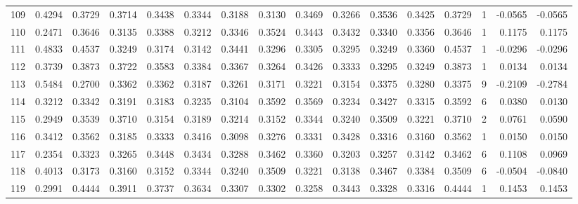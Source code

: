 \begin{tabular}{lrrrrrrrrrrrrrrr}
109 &      0.4294 &  0.3729 &  0.3714 &  0.3438 &  0.3344 &  0.3188 &  0.3130 &  0.3469 &  0.3266 &  0.3536 &   0.3425 &     0.3729 &      1 &                   -0.0565 &                    -0.0565 \\
110 &      0.2471 &  0.3646 &  0.3135 &  0.3388 &  0.3212 &  0.3346 &  0.3524 &  0.3443 &  0.3432 &  0.3340 &   0.3356 &     0.3646 &      1 &                    0.1175 &                     0.1175 \\
111 &      0.4833 &  0.4537 &  0.3249 &  0.3174 &  0.3142 &  0.3441 &  0.3296 &  0.3305 &  0.3295 &  0.3249 &   0.3360 &     0.4537 &      1 &                   -0.0296 &                    -0.0296 \\
112 &      0.3739 &  0.3873 &  0.3722 &  0.3583 &  0.3384 &  0.3367 &  0.3264 &  0.3426 &  0.3333 &  0.3295 &   0.3249 &     0.3873 &      1 &                    0.0134 &                     0.0134 \\
113 &      0.5484 &  0.2700 &  0.3362 &  0.3362 &  0.3187 &  0.3261 &  0.3171 &  0.3221 &  0.3154 &  0.3375 &   0.3280 &     0.3375 &      9 &                   -0.2109 &                    -0.2784 \\
114 &      0.3212 &  0.3342 &  0.3191 &  0.3183 &  0.3235 &  0.3104 &  0.3592 &  0.3569 &  0.3234 &  0.3427 &   0.3315 &     0.3592 &      6 &                    0.0380 &                     0.0130 \\
115 &      0.2949 &  0.3539 &  0.3710 &  0.3154 &  0.3189 &  0.3214 &  0.3152 &  0.3344 &  0.3240 &  0.3509 &   0.3221 &     0.3710 &      2 &                    0.0761 &                     0.0590 \\
116 &      0.3412 &  0.3562 &  0.3185 &  0.3333 &  0.3416 &  0.3098 &  0.3276 &  0.3331 &  0.3428 &  0.3316 &   0.3160 &     0.3562 &      1 &                    0.0150 &                     0.0150 \\
117 &      0.2354 &  0.3323 &  0.3265 &  0.3448 &  0.3434 &  0.3288 &  0.3462 &  0.3360 &  0.3203 &  0.3257 &   0.3142 &     0.3462 &      6 &                    0.1108 &                     0.0969 \\
118 &      0.4013 &  0.3173 &  0.3160 &  0.3152 &  0.3344 &  0.3240 &  0.3509 &  0.3221 &  0.3138 &  0.3467 &   0.3384 &     0.3509 &      6 &                   -0.0504 &                    -0.0840 \\
119 &      0.2991 &  0.4444 &  0.3911 &  0.3737 &  0.3634 &  0.3307 &  0.3302 &  0.3258 &  0.3443 &  0.3328 &   0.3316 &     0.4444 &      1 &                    0.1453 &                     0.1453 \\

\end{tabular}
